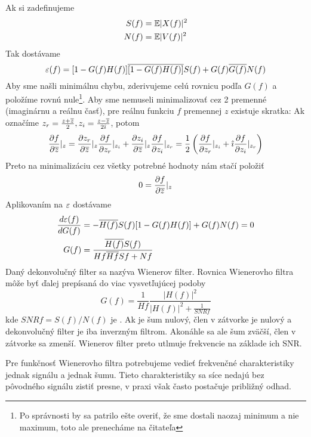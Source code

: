 Ak si zadefinujeme
\begin{align*}
 S(f) &= {\mathbb{E}}| X(f)|^2 \\
 N(f) &= {\mathbb{E}}| V(f)|^2
\end{align*}
Tak dostávame
\begin{equation*}
\varepsilon(f) = [1-G(f)H(f)]\overline{[1-G(f)H(f)]} S(f)
   + G(f) \overline{G(f)} N(f)
\end{equation*}
Aby sme našli minimálnu chybu, zderivujeme celú rovnicu podľa $G(f)$ a
položíme rovnú nule\footnote{Po správnosti by sa patrilo ešte overiť,
že sme dostali naozaj minimum a nie maximum, toto ale prenecháme na
čitateľa}. Aby sme nemuseli minimalizovať cez 2 premenné (imaginárnu a
reálnu časť), pre reálnu funkciu $f$ premennej $z$ existuje skratka:
Ak označíme $z_r = \frac{z + \overline{z}}{2}, z_i =
\frac{z-\overline{z}}{2 \hat{\imath}}$, potom
\begin{equation*}
\frac{\partial f}{\partial \overline{z}}|_z = 
  \frac{\partial z_r}{\partial \overline{z}}|_z \frac{\partial f}{\partial z_r}|_{z_i} +
    \frac{\partial z_i}{\partial \overline{z}}|_z \frac{\partial f}{\partial z_i}|_{z_r} =
 \frac{1}{2} \left(
    \frac{\partial f}{\partial z_r}|_{z_i} + \hat{\imath} \frac{\partial f}{\partial z_i}|_{z_r}
    \right)
\end{equation*}
Preto na minimalizáciu cez všetky potrebné hodnoty nám stačí položiť
\begin{equation*}
 0 = \frac{\partial f}{\partial \overline{z}}|_z
\end{equation*}
Aplikovaním na $\varepsilon$ dostávame
\begin{align*}
\frac{d \varepsilon(f)}{d G(f)} &= -\overline{H(f)} S(f)[1 - G(f) H(f)]  + G(f) N(f) =
0 \\
G(f) &= \frac{\overline{H(f)} S(f)}{H{f}\overline{H{f}} S{f} + N{f}}
\end{align*}
Daný dekonvolučný filter sa nazýva Wienerov filter.
Rovnica Wienerovho filtra môže byť ďalej prepísaná do viac vysvetľujúcej podoby
\begin{equation*}
G(f) = \frac{1}{H{f}} 
   \frac{|H(f)|^2}{|H(f)|^2 + \frac{1}{SNR{f}}}
\end{equation*}
kde $SNR{f} = S(f)/N(f)$ je . Ak je šum
nulový, člen v zátvorke je nulový a dekonvolučný filter je iba
inverzným filtrom. Akonáhle sa ale šum zväčší, člen v zátvorke sa
zmenší. Wienerov filter preto utlmuje frekvencie na základe ich SNR.

Pre funkčnosť Wienerovho filtra potrebujeme vedieť frekvenčné
charakteristiky jednak signálu a jednak šumu. Tieto charakteristiky sa
síce nedajú bez pôvodného signálu zistiť presne, v praxi však často
postačuje približný odhad.

